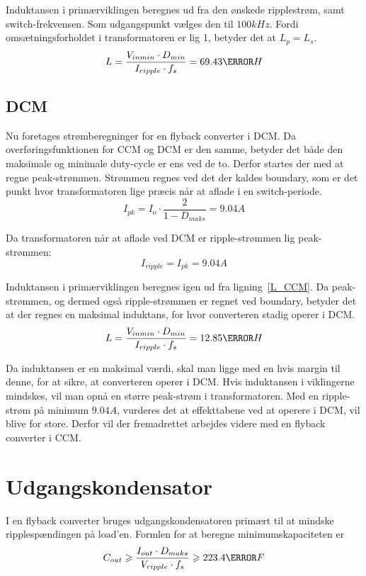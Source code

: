 Induktansen i primærviklingen beregnes ud fra den ønskede ripplestrøm, samt switch-frekvensen. Som udgangspunkt vælges den til $100kHz$. Fordi omsætningsforholdet i transformatoren er lig 1, betyder det at $L_p = L_s$.
\begin{equation} \label{L_CCM}
L = \frac{V_{inmin} \cdot D_{min}}{I_{ripple} \cdot f_s} = 69.43\micro H
\end{equation}

\subsection{DCM}
Nu foretages strømberegninger for en flyback converter i DCM.
Da overføringsfunktionen for CCM og DCM er den samme, betyder det både den maksimale og minimale duty-cycle er ens ved de to.
Derfor startes der med at regne peak-strømmen. Strømmen regnes ved det der kaldes boundary, som er det punkt hvor transformatoren lige præcis når at aflade i en switch-periode.
\begin{equation} \label{DCM_peak_current}
I_{pk} = I_o \cdot \frac{2}{1-D_{maks}} = 9.04A
\end{equation}

\noindent Da transformatoren når at aflade ved DCM er ripple-strømmen lig peak-strømmen:
\begin{equation} \label{DCM_ripple_current}
I_{ripple} = I_{pk} = 9.04A
\end{equation}

\noindent Induktansen i primærviklingen beregnes igen ud fra ligning~\ref{L_CCM}. Da peak-strømmen, og dermed også ripple-strømmen er regnet ved boundary, betyder det at der regnes en maksimal induktans, for hvor converteren stadig operer i DCM.
\begin{equation} \label{L_DCM}
L = \frac{V_{inmin} \cdot D_{min}}{I_{ripple} \cdot f_s} = 12.85\micro H
\end{equation}

\noindent Da induktansen er en maksimal værdi, skal man ligge med en hvis margin til denne, for at sikre, at converteren operer i DCM. Hvis induktansen i viklingerne mindskes, vil man opnå en større peak-strøm i transformatoren. Med en ripple-strøm på minimum $9.04A$, vurderes det at effekttabene ved at operere i DCM, vil blive for store. Derfor vil der fremadrettet arbejdes videre med en flyback converter i CCM.


\section{Udgangskondensator}
I en flyback converter bruges udgangskondensatoren primært til at mindske ripplespændingen på load'en. Formlen for at beregne minimumskapaciteten er
\begin{equation} \label{udgangskondensator}
C_{out} \geqslant \frac{I_{out} \cdot D_{maks}}{V_{ripple} \cdot f_s} \geqslant 223.4 \micro F
\end{equation}

